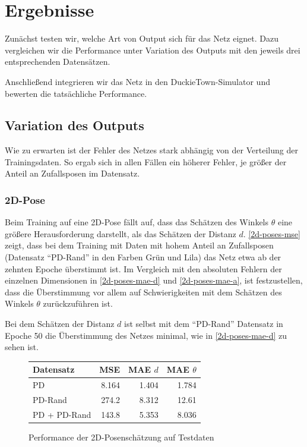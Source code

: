 \chapter{Ergebnisse}

Zunächst testen wir, welche Art von Output sich für das Netz eignet. Dazu vergleichen wir die Performance unter Variation des Outputs mit den jeweils drei entsprechenden Datensätzen. 

Anschließend integrieren wir das Netz in den DuckieTown-Simulator und bewerten die tatsächliche Performance.

\section{Variation des Outputs}

Wie zu erwarten ist der Fehler des Netzes stark abhängig von der Verteilung der Trainingsdaten. So ergab sich in allen Fällen ein höherer Fehler, je größer der Anteil an Zufallsposen im Datensatz. 

\subsection{2D-Pose}

Beim Training auf eine 2D-Pose fällt auf, dass das Schätzen des Winkels $\theta$ eine größere Herausforderung darstellt, als das Schätzen der Distanz $d$. \ref{2d-poses-mse} zeigt, dass bei dem Training mit Daten mit hohem Anteil an Zufallsposen (Datensatz ``PD-Rand'' in den Farben Grün und Lila) das Netz etwa ab der zehnten Epoche überstimmt ist. Im Vergleich mit den absoluten Fehlern der einzelnen Dimensionen in \ref{2d-poses-mae-d} und \ref{2d-poses-mae-a}, ist festzustellen, dass die Überstimmung vor allem auf Schwierigkeiten mit dem Schätzen des Winkels $\theta$ zurückzuführen ist.

Bei dem Schätzen der Distanz $d$ ist selbst mit dem ``PD-Rand'' Datensatz in Epoche 50 die Überstimmung des Netzes minimal, wie in \ref{2d-poses-mae-d} zu sehen ist.


\begin{figure}[H]
	\centering
		\begin{tabular}[t]{|l|r|r|r|}
			\hline
			Datensatz & MSE & MAE $d$ & MAE $\theta$ \\
			\hline
			PD & 8.164 & 1.404 & 1.784 \\
			\hline
			PD-Rand & 274.2 & 8.312 & 12.61 \\
			\hline
			PD + PD-Rand & 143.8 & 5.353 & 8.036 \\
			\hline
		\end{tabular}
	\caption{Performance der 2D-Posenschätzung auf Testdaten}
	\label{2d-pose-performance}
\end{figure}

